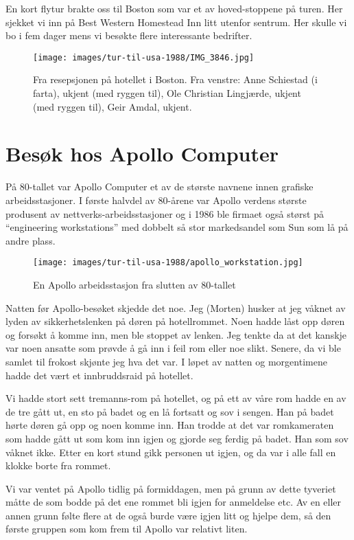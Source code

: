 En kort flytur brakte oss til Boston som var et av hoved-stoppene på turen. Her sjekket vi inn på Best Western Homestead Inn litt utenfor sentrum. Her skulle vi bo i fem dager mens vi besøkte flere interessante bedrifter.

\begin{figure}
	\texttt{[image: images/tur-til-usa-1988/IMG\_3846.jpg]}
	\caption{Fra resepsjonen på hotellet i Boston. Fra venstre: Anne Schiestad (i farta), ukjent (med ryggen til), Ole Christian Lingjærde, ukjent (med ryggen til), Geir Amdal, ukjent.}
\end{figure}

\section{Besøk hos Apollo Computer}

På 80-tallet var Apollo Computer et av de største navnene innen grafiske arbeidsstasjoner. I første halvdel av 80-årene var Apollo verdens største produsent av nettverks-arbeidsstasjoner og i 1986 ble firmaet også størst på “engineering workstations” med dobbelt så stor markedsandel som Sun som lå på andre plass.

\begin{figure}
	\texttt{[image: images/tur-til-usa-1988/apollo\_workstation.jpg]}
	\caption{En Apollo arbeidsstasjon fra slutten av 80-tallet}
\end{figure}

Natten før Apollo-besøket skjedde det noe. Jeg (Morten) husker at jeg våknet av lyden av sikkerhetslenken på døren på hotellrommet. Noen hadde låst opp døren og forsøkt å komme inn, men ble stoppet av lenken. Jeg tenkte da at det kanskje var noen ansatte som prøvde å gå inn i feil rom eller noe slikt. Senere, da vi ble samlet til frokost skjønte jeg hva det var. I løpet av natten og morgentimene hadde det vært et innbruddsraid på hotellet.

Vi hadde stort sett tremanns-rom på hotellet, og på ett av våre rom hadde en av de tre gått ut, en sto på badet og en lå fortsatt og sov i sengen. Han på badet hørte døren gå opp og noen komme inn. Han trodde at det var romkameraten som hadde gått ut som kom inn igjen og gjorde seg ferdig på badet. Han som sov våknet ikke. Etter en kort stund gikk personen ut igjen, og da var i alle fall en klokke borte fra rommet.

Vi var ventet på Apollo tidlig på formiddagen, men på grunn av dette tyveriet måtte de som bodde på det ene rommet bli igjen for anmeldelse etc. Av en eller annen grunn følte flere at de også burde være igjen litt og hjelpe dem, så den første gruppen som kom frem til Apollo var relativt liten.

